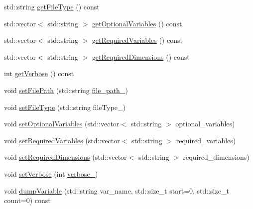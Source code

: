 \begin{DoxyCompactItemize}
\item 
std\+::string \mbox{\hyperlink{class_an_en_i_o_a6f51b190d64895a4ad907abcf4a10b75}{get\+File\+Type}} () const
\item 
std\+::vector$<$ std\+::string $>$ \mbox{\hyperlink{class_an_en_i_o_a50997e1baef5b8bb18d833c8c875a7bc}{get\+Optional\+Variables}} () const
\item 
std\+::vector$<$ std\+::string $>$ \mbox{\hyperlink{class_an_en_i_o_abd3cbf0e384dd9d610f985fb4131df9b}{get\+Required\+Variables}} () const
\item 
std\+::vector$<$ std\+::string $>$ \mbox{\hyperlink{class_an_en_i_o_ace777827f2548b3f06ce13f3ce4f4b6b}{get\+Required\+Dimensions}} () const
\item 
int \mbox{\hyperlink{class_an_en_i_o_a0bf0dab5e393c5597f97ab38c910e24d}{get\+Verbose}} () const
\item 
void \mbox{\hyperlink{class_an_en_i_o_a38bdc2d686737eba3812b3b41e073006}{set\+File\+Path}} (std\+::string \mbox{\hyperlink{class_an_en_i_o_ab892e06ca18be5e0c442c9e882e4475f}{file\+\_\+path\+\_\+}})
\item 
void \mbox{\hyperlink{class_an_en_i_o_ac1a951fd63d9b109e4574143e077f9b2}{set\+File\+Type}} (std\+::string file\+Type\+\_\+)
\item 
void \mbox{\hyperlink{class_an_en_i_o_abc499df15eac5fa3f203267723f5edfa}{set\+Optional\+Variables}} (std\+::vector$<$ std\+::string $>$ optional\+\_\+variables)
\item 
void \mbox{\hyperlink{class_an_en_i_o_a643c51c346118d8416fa2c2e0da8042a}{set\+Required\+Variables}} (std\+::vector$<$ std\+::string $>$ required\+\_\+variables)
\item 
void \mbox{\hyperlink{class_an_en_i_o_a239ea94b3648006920bcdcded4040ad3}{set\+Required\+Dimensions}} (std\+::vector$<$ std\+::string $>$ required\+\_\+dimensions)
\item 
void \mbox{\hyperlink{class_an_en_i_o_a696dff7bb250fc45b597e5f82e33e23e}{set\+Verbose}} (int \mbox{\hyperlink{class_an_en_i_o_a4f6abd007730e4a8f54d57cc3572bd9e}{verbose\+\_\+}})
\item 
void \mbox{\hyperlink{class_an_en_i_o_acd5682e81361d75ff5566ae1df5fa023}{dump\+Variable}} (std\+::string var\+\_\+name, std\+::size\+\_\+t start=0, std\+::size\+\_\+t count=0) const
\end{DoxyCompactItemize}
